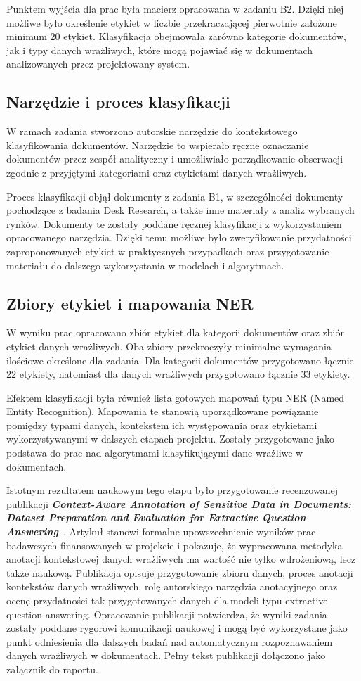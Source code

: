\documentclass[12pt,a4paper]{report}
\begin{document}
Punktem wyjścia dla prac była macierz opracowana w zadaniu B2. Dzięki niej możliwe było określenie etykiet w liczbie przekraczającej pierwotnie założone minimum 20 etykiet. Klasyfikacja obejmowała zarówno kategorie dokumentów, jak i typy danych wrażliwych, które mogą pojawiać się w dokumentach analizowanych przez projektowany system.

\subsection{Narzędzie i proces klasyfikacji}
W ramach zadania stworzono autorskie narzędzie do kontekstowego klasyfikowania dokumentów. Narzędzie to wspierało ręczne oznaczanie dokumentów przez zespół analityczny i umożliwiało porządkowanie obserwacji zgodnie z przyjętymi kategoriami oraz etykietami danych wrażliwych.

Proces klasyfikacji objął dokumenty z zadania B1, w szczególności dokumenty pochodzące z badania Desk Research, a także inne materiały z analiz wybranych rynków. Dokumenty te zostały poddane ręcznej klasyfikacji z wykorzystaniem opracowanego narzędzia. Dzięki temu możliwe było zweryfikowanie przydatności zaproponowanych etykiet w praktycznych przypadkach oraz przygotowanie materiału do dalszego wykorzystania w modelach i algorytmach.

\subsection{Zbiory etykiet i mapowania NER}
W wyniku prac opracowano zbiór etykiet dla kategorii dokumentów oraz zbiór etykiet danych wrażliwych. Oba zbiory przekroczyły minimalne wymagania ilościowe określone dla zadania. Dla kategorii dokumentów przygotowano łącznie 22 etykiety, natomiast dla danych wrażliwych przygotowano łącznie 33 etykiety.

Efektem klasyfikacji była również lista gotowych mapowań typu NER (Named Entity Recognition). Mapowania te stanowią uporządkowane powiązanie pomiędzy typami danych, kontekstem ich występowania oraz etykietami wykorzystywanymi w dalszych etapach projektu. Zostały przygotowane jako podstawa do prac nad algorytmami klasyfikującymi dane wrażliwe w dokumentach.

Istotnym rezultatem naukowym tego etapu było przygotowanie recenzowanej publikacji \textit{\textbf{Context-Aware Annotation of Sensitive Data in Documents: Dataset Preparation and Evaluation for Extractive Question Answering}}~\cite{legumina2025contextawareannotation}. Artykuł stanowi formalne upowszechnienie wyników prac badawczych finansowanych w projekcie i pokazuje, że wypracowana metodyka anotacji kontekstowej danych wrażliwych ma wartość nie tylko wdrożeniową, lecz także naukową. Publikacja opisuje przygotowanie zbioru danych, proces anotacji kontekstów danych wrażliwych, rolę autorskiego narzędzia anotacyjnego oraz ocenę przydatności tak przygotowanych danych dla modeli typu extractive question answering. Opracowanie publikacji potwierdza, że wyniki zadania zostały poddane rygorowi komunikacji naukowej i mogą być wykorzystane jako punkt odniesienia dla dalszych badań nad automatycznym rozpoznawaniem danych wrażliwych w dokumentach. Pełny tekst publikacji dołączono jako załącznik do raportu.
\end{document}
